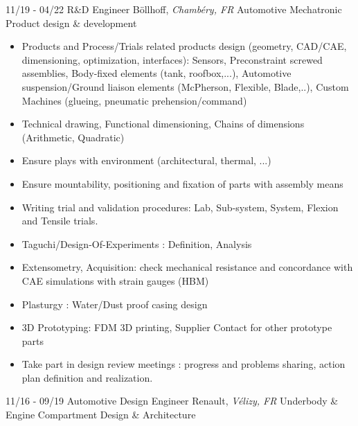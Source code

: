 \documentclass[]{friggeri-cv}
\begin{document}
\begin{entrylist}
  \entry
    {11/19 - 04/22}
    {R\&D Engineer}
    {Böllhoff, \textit{Chambéry, FR}}
    {Automotive Mechatronic Product design \& development}
\end{entrylist}
\vspace{-15pt}

\vspace{0.5mm}
\begin{itemize}
\setlength{\itemsep}{1pt}
\setlength{\parskip}{0pt}
\setlength{\parsep}{0pt}

\item Products and Process/Trials related products design (geometry, CAD/CAE, dimensioning, optimization, interfaces): Sensors, Preconstraint screwed assemblies, Body-fixed elements (tank, roofbox,...), Automotive suspension/Ground liaison elements (McPherson, Flexible, Blade,..), Custom Machines (glueing, pneumatic prehension/command)
\item Technical drawing, Functional dimensioning, Chains of dimensions (Arithmetic, Quadratic)
\item Ensure plays with environment (architectural, thermal, ...)
\item Ensure mountability, positioning and fixation of parts with assembly means
\item Writing trial and validation procedures: Lab, Sub-system, System, Flexion and Tensile trials.
\item Taguchi/Design-Of-Experiments : Definition, Analysis
\item Extensometry, Acquisition: check mechanical resistance and concordance with CAE simulations with strain gauges (HBM)
\item Plasturgy : Water/Dust proof casing design
\item 3D Prototyping: FDM 3D printing, Supplier Contact for other prototype parts
\item Take part in design review meetings : progress and problems sharing, action plan definition and realization.
\end{itemize}

\begin{entrylist}
  \entry
    {11/16 - 09/19}
    {Automotive Design Engineer}
    {Renault, \textit{Vélizy, FR}}
    {Underbody \& Engine Compartment Design \& Architecture}
\end{entrylist}
\vspace{-15pt}
\end{document}
